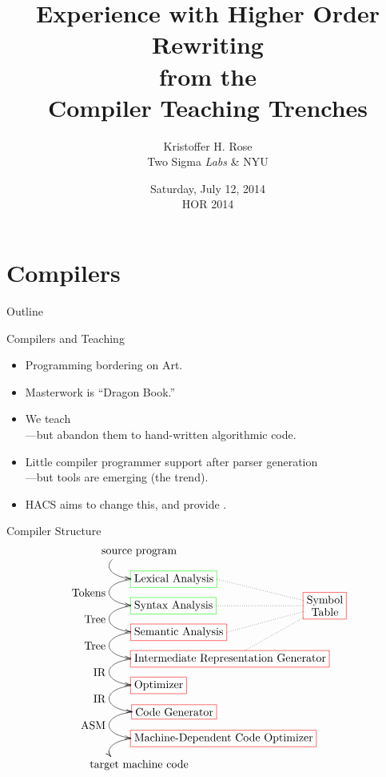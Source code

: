 \documentclass[pdftex,aspectratio=169,14pt]{beamer}
\title{Experience with Higher Order Rewriting\\from the\\Compiler Teaching Trenches}
\author[Kris Rose]{Kristoffer H. Rose\\Two Sigma \emph{Labs} \& NYU}
\date{Saturday, July 12, 2014\\HOR 2014}
\begin{document}
\frame{\titlepage}



\section{Compilers}
\begin{frame}{Outline}
  \tableofcontents[current]
\end{frame}

\begin{frame}{Compilers and Teaching}
  \begin{itemize}

  \item Programming  \pause bordering on \alert{Art}.\pause

  \item Masterwork is ``Dragon Book.''\pause

  \item We teach  \\\pause%
    ---but abandon them to \alert{hand-written algorithmic code}.\pause

  \item Little compiler programmer support after parser generation \\\pause%
    ---but tools are emerging (the  trend).
    
  \item HACS aims to change this, and provide .\pause

  \end{itemize}
\end{frame}

\begin{frame}{Compiler Structure}
  \vspace*{-1em}
  \begin{displaymath}
    \xygraph{!{;(.66,0):}
      []*+\txt{source program}
      :@(l,l)  [d]*+[r][F:green]\txt{Lexical Analysis}="L"
      :@(l,l) _{\txt{Tokens}} [d]*+[r][F:green]\txt{Syntax Analysis}="P"
      :@(l,l) _{\txt{Tree}}  [d]*+[r][F:red]\txt{Semantic Analysis}="A"
      :@(l,l) _{\txt{Tree}} [d]*+[r][F:red]\txt{Intermediate Representation Generator}="IR"
                              ( "P"[r(7)]*+[F:red]\txt{Symbol\\Table}
                                ( -@. "L"!{+R} , -@. "P"!{+R} , -@. "A"!{+R} , -@. "IR"!{!C} ) )
      :@(l,l) _{\txt{IR}} [d]*+[r][F:red]\txt{Optimizer}
      :@(l,l) _{\txt{IR}} [d]*+[r][F:red]\txt{Code Generator}
      :@(l,l) _{\txt{ASM}} [d]*+[r][F:red]\txt{Machine-Dependent Code Optimizer}
      :@(l,l)  [d]*+\txt{target machine code}
    }
  \end{displaymath}
\end{frame}
\end{document}
